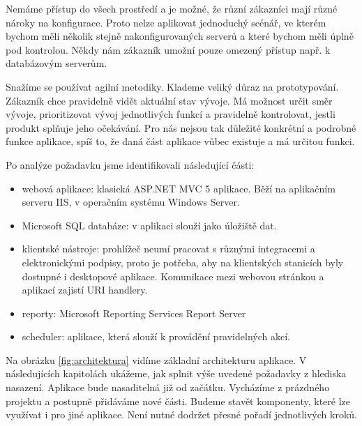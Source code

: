 Nemáme přístup do všech prostředí a je možné, že různí zákazníci mají různé nároky na konfigurace. Proto nelze aplikovat jednoduchý scénář, ve kterém bychom měli několik stejně nakonfigurovaných serverů a které bychom měli úplně pod kontrolou. Někdy nám zákazník umožní pouze omezený přístup např. k databázovým serverům.

Snažíme se používat agilní metodiky. Klademe veliký důraz na prototypování. Zákazník chce pravidelně vidět aktuální stav vývoje. Má možnost určit směr vývoje, prioritizovat vývoj jednotlivých funkcí a pravidelně kontrolovat, jestli produkt splňuje jeho očekávání. Pro nás nejsou tak důležité konkrétní a podrobné funkce aplikace, spíš to, že daná část aplikace vůbec existuje a má určitou funkci.

Po analýze požadavku jsme identifikovali následující části:
\begin{itemize}
\item webová aplikace: klasická ASP.NET MVC 5 aplikace. Běží na aplikačním serveru IIS, v operačním systému Windows Server.
\item Microsoft SQL databáze: v aplikaci slouží jako úložiště dat.
\item klientské nástroje: prohlížeč neumí pracovat s různými integracemi a elektronickými podpisy, proto je potřeba, aby na klientských stanicích byly dostupné i desktopové aplikace. Komunikace mezi webovou stránkou a aplikací zajistí URI handlery.
\item reporty: Microsoft Reporting Services Report Server
\item scheduler: aplikace, která slouží k provádění pravidelných akcí.
\end{itemize}

Na obrázku \ref{fig:architektura} vidíme základní architekturu aplikace. V následujících kapitolách ukážeme, jak splnit výše uvedené požadavky z hlediska nasazení. Aplikace bude nasaditelná již od začátku. Vycházíme z prázdného projektu a postupně přidáváme nové části. Budeme stavět komponenty, které lze využívat i pro jiné aplikace. Není nutné dodržet přesné pořadí jednotlivých kroků.


